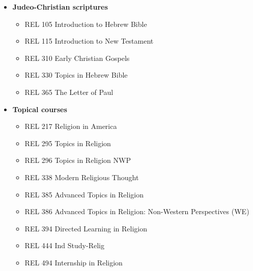 \documentclass[
  letterpaper,
]{scrbook}
\providecommand{\tightlist}{%
  \setlength{\itemsep}{0pt}\setlength{\parskip}{0pt}}
\begin{document}
\begin{itemize}
\tightlist
\item
  \textbf{Judeo-Christian scriptures}

  \begin{itemize}
  \tightlist
  \item
    REL 105 Introduction to Hebrew Bible
  \item
    REL 115 Introduction to New Testament
  \item
    REL 310 Early Christian Gospels
  \item
    REL 330 Topics in Hebrew Bible
  \item
    REL 365 The Letter of Paul
  \end{itemize}
\item
  \textbf{Topical courses}

  \begin{itemize}
  \tightlist
  \item
    REL 217 Religion in America
  \item
    REL 295 Topics in Religion
  \item
    REL 296 Topics in Religion NWP
  \item
    REL 338 Modern Religious Thought
  \item
    REL 385 Advanced Topics in Religion
  \item
    REL 386 Advanced Topics in Religion: Non-Western Perspectives (WE)
  \item
    REL 394 Directed Learning in Religion
  \item
    REL 444 Ind Study-Relig
  \item
    REL 494 Internship in Religion
  \end{itemize}
\end{itemize}
\end{document}
